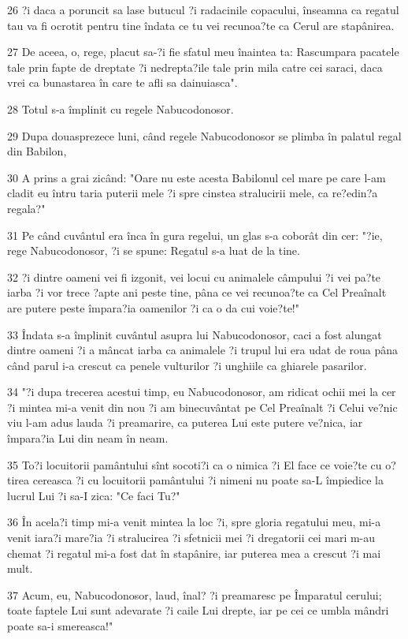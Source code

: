\par 26 ?i daca a poruncit sa lase butucul ?i radacinile copacului, înseamna ca regatul tau va fi ocrotit pentru tine îndata ce tu vei recunoa?te ca Cerul are stapânirea.
\par 27 De aceea, o, rege, placut sa-?i fie sfatul meu înaintea ta: Rascumpara pacatele tale prin fapte de dreptate ?i nedrepta?ile tale prin mila catre cei saraci, daca vrei ca bunastarea în care te afli sa dainuiasca".
\par 28 Totul s-a împlinit cu regele Nabucodonosor.
\par 29 Dupa douasprezece luni, când regele Nabucodonosor se plimba în palatul regal din Babilon,
\par 30 A prins a grai zicând: "Oare nu este acesta Babilonul cel mare pe care l-am cladit eu întru taria puterii mele ?i spre cinstea stralucirii mele, ca re?edin?a regala?"
\par 31 Pe când cuvântul era înca în gura regelui, un glas s-a coborât din cer: "?ie, rege Nabucodonosor, ?i se spune: Regatul s-a luat de la tine.
\par 32 ?i dintre oameni vei fi izgonit, vei locui cu animalele câmpului ?i vei pa?te iarba ?i vor trece ?apte ani peste tine, pâna ce vei recunoa?te ca Cel Preaînalt are putere peste împara?ia oamenilor ?i ca o da cui voie?te!"
\par 33 Îndata s-a împlinit cuvântul asupra lui Nabucodonosor, caci a fost alungat dintre oameni ?i a mâncat iarba ca animalele ?i trupul lui era udat de roua pâna când parul i-a crescut ca penele vulturilor ?i unghiile ca ghiarele pasarilor.
\par 34 "?i dupa trecerea acestui timp, eu Nabucodonosor, am ridicat ochii mei la cer ?i mintea mi-a venit din nou ?i am binecuvântat pe Cel Preaînalt ?i Celui ve?nic viu l-am adus lauda ?i preamarire, ca puterea Lui este putere ve?nica, iar împara?ia Lui din neam în neam.
\par 35 To?i locuitorii pamântului sînt socoti?i ca o nimica ?i El face ce voie?te cu o?tirea cereasca ?i cu locuitorii pamântului ?i nimeni nu poate sa-L împiedice la lucrul Lui ?i sa-I zica: "Ce faci Tu?"
\par 36 În acela?i timp mi-a venit mintea la loc ?i, spre gloria regatului meu, mi-a venit iara?i mare?ia ?i stralucirea ?i sfetnicii mei ?i dregatorii cei mari m-au chemat ?i regatul mi-a fost dat în stapânire, iar puterea mea a crescut ?i mai mult.
\par 37 Acum, eu, Nabucodonosor, laud, înal? ?i preamaresc pe Împaratul cerului; toate faptele Lui sunt adevarate ?i caile Lui drepte, iar pe cei ce umbla mândri poate sa-i smereasca!"

